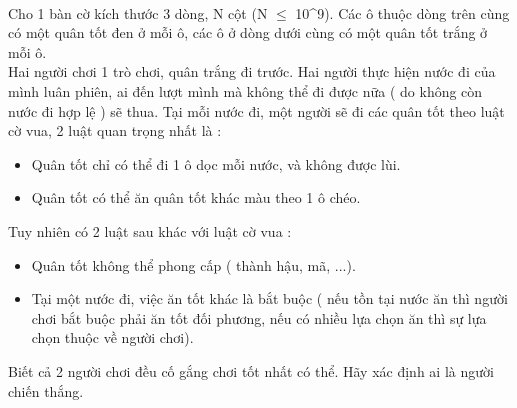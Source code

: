  

Cho 1 bàn cờ kích thước 3 dòng, N cột (N $\le$ 10^9). Các ô thuộc dòng trên cùng có một quân tốt đen ở mỗi ô, các ô ở dòng dưới cùng có một quân tốt trắng ở mỗi ô.
\\Hai người chơi 1 trò chơi, quân trắng đi trước. Hai người thực hiện nước đi của mình luân phiên, ai đến lượt mình mà không thể đi được nữa ( do không còn nước đi hợp lệ ) sẽ thua. Tại mỗi nước đi, một người sẽ đi các quân tốt theo luật cờ vua, 2 luật quan trọng nhất là :
\begin{itemize}
	\item Quân tốt chỉ có thể đi 1 ô dọc mỗi nước, và không được lùi.
	\item Quân tốt có thể ăn quân tốt khác màu theo 1 ô chéo.
\end{itemize}

Tuy nhiên có 2 luật sau khác với luật cờ vua :
\begin{itemize}
	\item Quân tốt không thể phong cấp ( thành hậu, mã, ...).
	\item Tại một nước đi, việc ăn tốt khác là bắt buộc ( nếu tồn tại nước ăn thì người chơi bắt buộc phải ăn tốt đối phương, nếu có nhiều lựa chọn ăn thì sự lựa chọn thuộc về người chơi).
\end{itemize}

Biết cả 2 người chơi đều cố gắng chơi tốt nhất có thể. Hãy xác định ai là người chiến thắng.